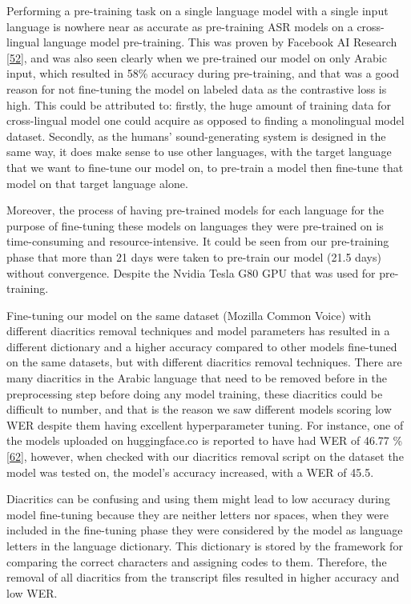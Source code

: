 \documentclass[
  a4paper,
]{article}
\begin{document}
Performing a pre-training task on a single language model with a single
input language is nowhere near as accurate as pre-training ASR models on
a cross-lingual language model pre-training. This was proven by Facebook
AI Research \protect\hyperlink{ref-lample2019crosslingual}{{[}52{]}},
and was also seen clearly when we pre-trained our model on only Arabic
input, which resulted in 58\% accuracy during pre-training, and that was
a good reason for not fine-tuning the model on labeled data as the
contrastive loss is high. This could be attributed to: firstly, the huge
amount of training data for cross-lingual model one could acquire as
opposed to finding a monolingual model dataset. Secondly, as the humans'
sound-generating system is designed in the same way, it does make sense
to use other languages, with the target language that we want to
fine-tune our model on, to pre-train a model then fine-tune that model
on that target language alone.

Moreover, the process of having pre-trained models for each language for
the purpose of fine-tuning these models on languages they were
pre-trained on is time-consuming and resource-intensive. It could be
seen from our pre-training phase that more than 21 days were taken to
pre-train our model (21.5 days) without convergence. Despite the Nvidia
Tesla G80 GPU that was used for pre-training.

Fine-tuning our model on the same dataset (Mozilla Common Voice) with
different diacritics removal techniques and model parameters has
resulted in a different dictionary and a higher accuracy compared to
other models fine-tuned on the same datasets, but with different
diacritics removal techniques. There are many diacritics in the Arabic
language that need to be removed before in the preprocessing step before
doing any model training, these diacritics could be difficult to number,
and that is the reason we saw different models scoring low WER despite
them having excellent hyperparameter tuning. For instance, one of the
models uploaded on huggingface.co is reported to have had WER of 46.77
\% \protect\hyperlink{ref-Huggingface_othrif}{{[}62{]}}, however, when
checked with our diacritics removal script on the dataset the model was
tested on, the model's accuracy increased, with a WER of 45.5.

Diacritics can be confusing and using them might lead to low accuracy
during model fine-tuning because they are neither letters nor spaces,
when they were included in the fine-tuning phase they were considered by
the model as language letters in the language dictionary. This
dictionary is stored by the framework for comparing the correct
characters and assigning codes to them. Therefore, the removal of all
diacritics from the transcript files resulted in higher accuracy and low
WER.
\end{document}
